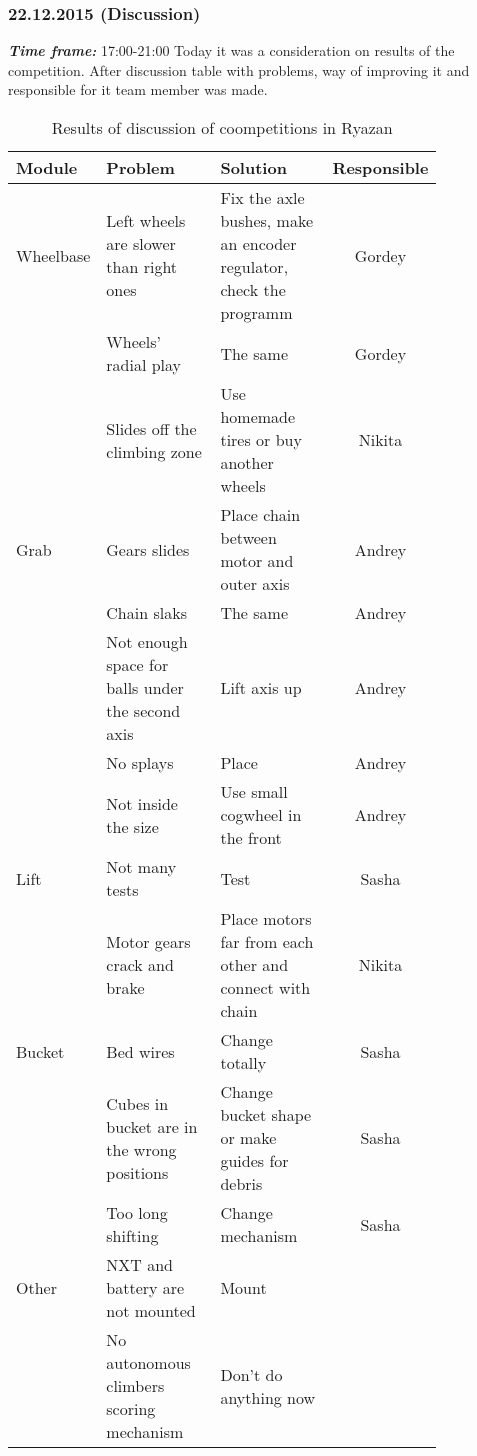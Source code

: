 \subsubsection{22.12.2015 (Discussion)}
\textit{\textbf{Time frame:}} 17:00-21:00 \newline
Today it was a consideration on results of the competition. After discussion table with problems, way of improving it and responsible for it team member was made.
\begin{table}[H]
	\caption{Results of discussion of coompetitions in Ryazan}
	\label{tabular:meetingRZN22.12}
	\begin{center}
		\begin{tabular}{p{0.12\linewidth}|p{0.35\linewidth}|p{0.38\linewidth}|c}
		  Module & Problem	& Solution	& Responsible \\
		  \hline
		  Wheelbase	& Left wheels are slower than right ones & Fix the axle bushes, make an encoder regulator, check the programm & Gordey \\
		  & Wheels' radial play & The same & Gordey \\
		  & Slides off the climbing zone	& Use homemade tires or buy another wheels & Nikita \\
		  \hline
		  Grab	& Gears slides	& Place chain between motor and outer axis & 	Andrey \\
		  & Chain slaks	& The same & Andrey \\	
		  & Not enough space for balls under the second axis	& Lift axis up	& Andrey \\
		  & No splays & Place & Andrey \\
		  & Not inside the size	& Use small cogwheel in the front & Andrey \\
		  \hline
		  Lift & Not many tests & Test & Sasha \\
		  & Motor gears crack and brake	& Place motors far from each other and connect with chain & Nikita \\
		  \hline
		  Bucket & Bed wires & Change totally	& Sasha \\
		  & Cubes in bucket are in the wrong positions	& Change bucket shape or make guides for debris	& Sasha \\
		  & Too long shifting	& Change mechanism & Sasha \\
		  \hline
		  Other	& NXT and battery are not mounted & Mount \\	
		  & No autonomous climbers scoring mechanism	& Don't do anything now & \\	
		  	
		\end{tabular}
	\end{center}
\end{table}

